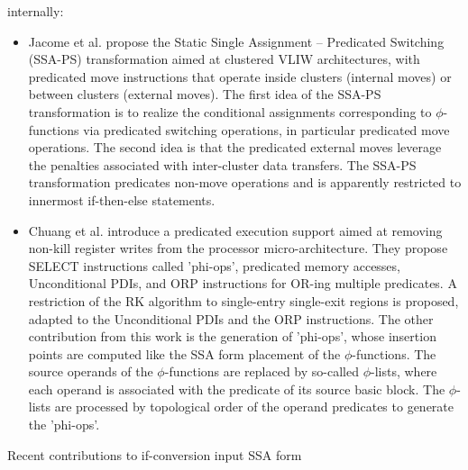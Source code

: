 internally: \begin{itemize}

\item Jacome et al. \cite{Jacome:2001:DAC} propose the Static Single Assignment
-- Predicated Switching (SSA-PS) transformation aimed at clustered VLIW
architectures, with predicated move instructions that operate inside clusters
(internal moves) or between clusters (external moves). The first idea of the
SSA-PS transformation is to realize the conditional assignments corresponding to
$\phi$-functions via predicated switching operations, in particular predicated
move operations. The second idea is that the predicated external moves leverage
the penalties associated with inter-cluster data transfers. The SSA-PS
transformation predicates non-move operations and is apparently restricted to
innermost if-then-else statements.

\item Chuang et al. \cite{Chuang:2003:CGO} introduce a predicated execution
support aimed at removing non-kill register writes from the processor
micro-architecture. They propose SELECT instructions called 'phi-ops',
predicated memory accesses, Unconditional PDIs, and ORP instructions for OR-ing
multiple predicates. A restriction of the RK algorithm to single-entry
single-exit regions is proposed, adapted to the Unconditional PDIs and the ORP
instructions. The other contribution from this work is the generation of
'phi-ops', whose insertion points are computed like the SSA form placement of the
$\phi$-functions. The source operands of the $\phi$-functions are replaced by
so-called $\phi$-lists, where each operand is associated with the predicate of
its source basic block. The $\phi$-lists are processed by topological order of
the operand predicates to generate the 'phi-ops'.

\end{itemize} Recent contributions to if-conversion input SSA form
